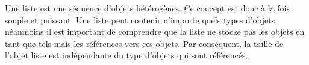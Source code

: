 
Une liste est une séquence d'objets hétérogènes. Ce concept est donc à la fois souple et puissant. Une liste peut contenir n'importe quels types d'objets, néanmoins il est important de comprendre que la liste ne stocke pas les objets en tant que tels mais les références vers ces objets. Par conséquent, la taille de l'objet liste est indépendante du type d'objets qui sont référencés.

